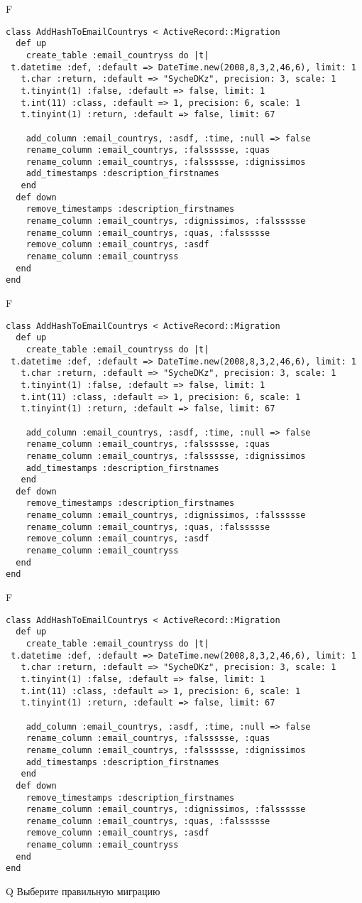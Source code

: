 F
\begin{verbatim}
class AddHashToEmailCountrys < ActiveRecord::Migration
  def up
    create_table :email_countryss do |t| 
 t.datetime :def, :default => DateTime.new(2008,8,3,2,46,6), limit: 1
   t.char :return, :default => "SycheDKz", precision: 3, scale: 1
   t.tinyint(1) :false, :default => false, limit: 1
   t.int(11) :class, :default => 1, precision: 6, scale: 1
   t.tinyint(1) :return, :default => false, limit: 67

    add_column :email_countrys, :asdf, :time, :null => false
    rename_column :email_countrys, :falssssse, :quas
    rename_column :email_countrys, :falssssse, :dignissimos
    add_timestamps :description_firstnames
   end
  def down
    remove_timestamps :description_firstnames
    rename_column :email_countrys, :dignissimos, :falssssse
    rename_column :email_countrys, :quas, :falssssse
    remove_column :email_countrys, :asdf
    rename_column :email_countryss
  end
end
\end{verbatim}

F
\begin{verbatim}
class AddHashToEmailCountrys < ActiveRecord::Migration
  def up
    create_table :email_countryss do |t| 
 t.datetime :def, :default => DateTime.new(2008,8,3,2,46,6), limit: 1
   t.char :return, :default => "SycheDKz", precision: 3, scale: 1
   t.tinyint(1) :false, :default => false, limit: 1
   t.int(11) :class, :default => 1, precision: 6, scale: 1
   t.tinyint(1) :return, :default => false, limit: 67

    add_column :email_countrys, :asdf, :time, :null => false
    rename_column :email_countrys, :falssssse, :quas
    rename_column :email_countrys, :falssssse, :dignissimos
    add_timestamps :description_firstnames
   end
  def down
    remove_timestamps :description_firstnames
    rename_column :email_countrys, :dignissimos, :falssssse
    rename_column :email_countrys, :quas, :falssssse
    remove_column :email_countrys, :asdf
    rename_column :email_countryss
  end
end
\end{verbatim}

F
\begin{verbatim}
class AddHashToEmailCountrys < ActiveRecord::Migration
  def up
    create_table :email_countryss do |t| 
 t.datetime :def, :default => DateTime.new(2008,8,3,2,46,6), limit: 1
   t.char :return, :default => "SycheDKz", precision: 3, scale: 1
   t.tinyint(1) :false, :default => false, limit: 1
   t.int(11) :class, :default => 1, precision: 6, scale: 1
   t.tinyint(1) :return, :default => false, limit: 67

    add_column :email_countrys, :asdf, :time, :null => false
    rename_column :email_countrys, :falssssse, :quas
    rename_column :email_countrys, :falssssse, :dignissimos
    add_timestamps :description_firstnames
   end
  def down
    remove_timestamps :description_firstnames
    rename_column :email_countrys, :dignissimos, :falssssse
    rename_column :email_countrys, :quas, :falssssse
    remove_column :email_countrys, :asdf
    rename_column :email_countryss
  end
end
\end{verbatim}
Q
Выберите правильную миграцию

